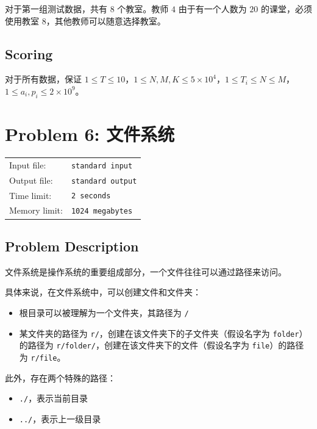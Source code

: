 \documentclass[12]{article}%
\begin{document}
对于第一组测试数据，共有 $8$ 个教室。教师 $4$ 由于有一个人数为 $20$ 的课堂，必须使用教室 $8$，其他教师可以随意选择教室。

\subsection*{\textsf{Scoring}}

\noindent 对于所有数据，保证 $1 \le T \le 10$，$1 \le N,M,K \le 5 \times 10^4$，$1 \le T_i \le N \le M$，$1 \le a_i,p_i \le 2 \times 10^9$。

\newpage
\section*{\textsf{Problem 6: }\textrm{文件系统}}
\begin{tabular}{ll}
	\fontsize{10pt}{10pt} Input file: & \fontsize{10pt}{10pt}\texttt{standard input} \\
	\fontsize{10pt}{10pt} Output file: & \fontsize{10pt}{10pt}\texttt{standard output}\\
	\fontsize{10pt}{10pt} Time limit: & \fontsize{10pt}{10pt}\texttt{2 seconds} \\
	\fontsize{10pt}{10pt} Memory limit: & \fontsize{10pt}{10pt}\texttt{1024 megabytes}\\
\end{tabular}
\subsection*{\textsf{Problem Description}}
文件系统是操作系统的重要组成部分，一个文件往往可以通过路径来访问。

具体来说，在文件系统中，可以创建文件和文件夹：

\begin{itemize}
	\item 根目录可以被理解为一个文件夹，其路径为 \texttt{/}
	\item 某文件夹的路径为 \texttt{r/}，创建在该文件夹下的子文件夹（假设名字为 \texttt{folder}）的路径为 \texttt{r/folder/}，创建在该文件夹下的文件（假设名字为 \texttt{file}）的路径为 \texttt{r/file}。
\end{itemize}



此外，存在两个特殊的路径：

\begin{itemize}
	\item \texttt{./}，表示当前目录
	\item \texttt{../}，表示上一级目录
\end{itemize}
\end{document}
